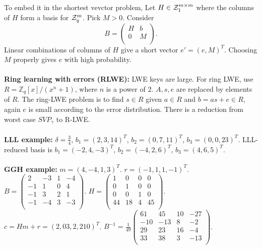 To embed it in the shortest vevctor problem, Let $H \in {\cal Z}_1^{m \times m}$ where the columns of $H$ form a
basis for ${\cal Z}_q^m$.  Pick $M > 0$.  Consider 
$$
B = 
\left(
\begin{array}{cc}
H &  b \\
0 &  M \\
\end{array}
\right).
$$
Linear combinations of columns of $H$ give a short vector $e' = (e, M)^T$.  Choosing $M$ properly gives $e$ with high probability.
\\
\\
{\bf Ring learning with errors (RLWE): }
LWE keys are large.  For ring LWE, use $R = {\mathbb Z}_q[x]/(x^n + 1)$, where $n$ is a power of  $2$.
$A, s, e$ are replaced by elements of $R$.  The ring-LWE problem is
to find $s  \in R$ given $a \in R$ and $b = as+e \in R$, again $e$ is small according to the error distribution.
There is a reduction from worst case $SVP_{\gamma}$ to R-LWE.
\\
\\
{\bf LLL example: }  $\delta = {\frac 3 4}$, 
$b_1 = (2, 3, 14)^T$,
$b_2 = (0, 7, 11)^T$,
$b_3 = (0, 0, 23)^T$.
LLL-reduced basis is 
$b_1 = (-2, 4, -3)^T$,
$b_2 = (-4, 2, 6)^T$,
$b_3 = (4, 6, 5)^T$.
\\
\\
{\bf GGH example: } 
$m= (4, -4, 1,3)^T$.
$r = (-1, 1,1,-1)^T$.
$ B = \left(
\begin{array}{cccc}
2 & -3 & 1 & -4 \\
-1 & 1 & 0 &4\\
-1 & 3 & 2 & 1\\
-1 & -4 & 3 & -3\\
\end{array}
\right)
$.
$ H = \left(
\begin{array}{cccc}
1 & 0 & 0 & 0\\
0 & 1 & 0 & 0\\
0 & 0 & 1 &0\\
44 & 18 & 4 &45 \\
\end{array}
\right)
$.
$c = Hm+r = (2, 03,2,210)^T$.
$ B^{-1} = {\frac 1 {49}} \left(
\begin{array}{cccc}
61 & 45 & 10 & -27\\
-10 & -13 & 8 & -2\\
29 & 23 & 16 & -4 \\
33 & 38 & 3 & -13 \\
\end{array}
\right)
$.
